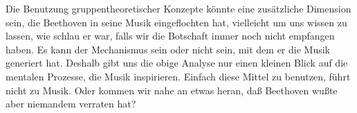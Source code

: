 Die Benutzung gruppentheoretischer Konzepte könnte eine zusätzliche Dimension sein, die Beethoven in seine Musik eingeflochten hat, vielleicht um uns wissen zu lassen, wie schlau er war, falls wir die Botschaft immer noch nicht empfangen haben.
Es kann der Mechanismus sein oder nicht sein, mit dem er die Musik generiert hat.
Deshalb gibt uns die obige Analyse nur einen kleinen Blick auf die mentalen Prozesse, die Musik inspirieren.
Einfach diese Mittel zu benutzen, führt nicht zu Musik.
Oder kommen wir nahe an etwas heran, daß Beethoven wußte aber niemandem verraten hat?



